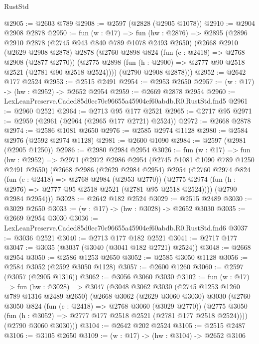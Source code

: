 \begin{lexlean}{RustStd}
\begin{coremodule}
@2905 := @2603 @789
@2908 := @2597 (@2828 (@2905 @1078))
@2910 := @2904 @2908 @2878
@2950 := fun (w : @17) =>
  fun (hw : @2876) =>
  @2895
    (@2896
      @2910
      @2878
      (@2745 @943 @840 @789 @1078 @2493 @2650)
      (@2668
        @2910
        (@2629 @2908 @2878)
        @2878
        (@2760
          @2898
          @824
          (fun (c : @2418) => @2768 @2908 (@2877 @2770))
          (@2775 @2898 (fun (h : @2900) => @2777 @90 @2518 @2521 (@2781 @90 @2518 @2524))))
        (@2790 @2908 @2878)))
@2952 := @2642 @177 @2524
@2953 := @2515 @2491
@2954 := @2953 @2650
@2957 := (w : @17) -> (hw : @2952) -> @2652 @2954
@2959 := @2669 @2878 @2954
@2960 := LexLeanPreserve.Caded85d0ec70c96655a45904ef60abdb.R0.RustStd.fnd5
@2961 := @2960 @2521
@2964 := @2713 @95 @177 @2521
@2965 := @2717 @95
@2971 := @2959 (@2961 (@2964 (@2965 @177 @2721) @2524))
@2972 := @2668 @2878
@2974 := @2586 @1081 @2650
@2976 := @2585 @2974 @1128
@2980 := @2584 @2976 (@2592 @2974 @1128)
@2981 := @2600 @1090
@2984 := @2597 (@2981 (@2905 @1250))
@2986 := @2980 @2984 @2954
@3026 := fun (w : @17) =>
  fun (hw : @2952) =>
  @2971
    (@2972
      @2986
      @2954
      (@2745 @1081 @1090 @789 @1250 @2491 @2650)
      (@2668
        @2986
        (@2629 @2984 @2954)
        @2954
        (@2760
          @2974
          @824
          (fun (c : @2418) => @2768 @2984 (@2953 @2770))
          (@2775 @2974 (fun (h : @2976) => @2777 @95 @2518 @2521 (@2781 @95 @2518 @2524))))
        (@2790 @2984 @2954)))
@3028 := @2642 @182 @2524
@3029 := @2515 @2489
@3030 := @3029 @2650
@3033 := (w : @17) -> (hw : @3028) -> @2652 @3030
@3035 := @2669 @2954 @3030
@3036 := LexLeanPreserve.Caded85d0ec70c96655a45904ef60abdb.R0.RustStd.fnd6
@3037 := @3036 @2521
@3040 := @2713 @177 @182 @2521
@3041 := @2717 @177
@3047 := @3035 (@3037 (@3040 (@3041 @182 @2721) @2524))
@3048 := @2668 @2954
@3050 := @2586 @1253 @2650
@3052 := @2585 @3050 @1128
@3056 := @2584 @3052 (@2592 @3050 @1128)
@3057 := @2600 @1260
@3060 := @2597 (@3057 (@2905 @1316))
@3062 := @3056 @3060 @3030
@3102 := fun (w : @17) =>
  fun (hw : @3028) =>
  @3047
    (@3048
      @3062
      @3030
      (@2745 @1253 @1260 @789 @1316 @2489 @2650)
      (@2668
        @3062
        (@2629 @3060 @3030)
        @3030
        (@2760
          @3050
          @824
          (fun (c : @2418) => @2768 @3060 (@3029 @2770))
          (@2775 @3050 (fun (h : @3052) => @2777 @177 @2518 @2521 (@2781 @177 @2518 @2524))))
        (@2790 @3060 @3030)))
@3104 := @2642 @202 @2524
@3105 := @2515 @2487
@3106 := @3105 @2650
@3109 := (w : @17) -> (hw : @3104) -> @2652 @3106

\end{coremodule}
\end{lexlean}
